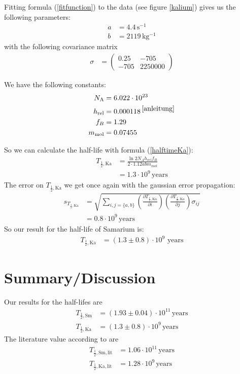 \documentclass[12pt]{article}
\newcommand{\del}[2][]{\frac{\partial #1}{\partial #2}}
\begin{document}
Fitting formula (\ref{fitfunction}) to the data (see figure \ref{kalium}) gives us the following parameters:
\begin{align*}
	a&=4.4\,\mathrm{s^{-1}}\\
	b&=2119\,\mathrm{kg^{-1}}
\end{align*}
with the following covariance matrix
\begin{align*}
\sigma&=\left(
	\begin{matrix}
		0.25&-705\\
		-705&2250000
	\end{matrix}
\right)
\end{align*}

We have the following constants:
\begin{align*}
	N_{\text{A}}&=6.022\cdot10^{23}\\
	h_{\text{rel}}&=0.000118\,^{\cite{anleitung}}\\
	f_B&=1.29\\
	m_{\text{mol}}&=0.07455
\end{align*}

So we can calculate the half-life with formula (\ref{halftimeKa}):
\begin{align*}
	T_{\frac12,\text{Ka}}&=\frac{\ln2N_Ah_{rel}f_B}{2\cdot1.12abm_{mol}}\\
	&=1.3\cdot10^{9}\,\text{years}
\end{align*}
The error on $T_{\frac12,\text{Ka}}$ we get once again with the gaussian error propagation: 
\begin{align*}
	s_{T_{\frac12,\text{Ka}}}&=\sqrt{\sum_{i,j=\{a,b\}}\left(\del[T_{\frac12,\text{Ka}}]{i}\right)\left(\del[T_{\frac12,\text{Ka}}]{j}\right)\sigma_{ij}}\\
	&=0.8\cdot10^9\,\text{years}
\end{align*}
So our result for the half-life of Samarium is:
\begin{align*}
T_{\frac12,\text{Ka}}&=\left(1.3\pm0.8\right)\cdot10^{9}\text{ years}
\end{align*}
\newpage
\section{Summary/Discussion}
Our results for the half-lifes are
\begin{align*}
	T_{\frac12,\text{Sm}}&=\left(1.93\pm0.04\right)\cdot10^{11}\,\text{years}\\
	T_{\frac12,\text{Ka}}&=\left(1.3 \pm0.8 \right)\cdot10^{9} \,\text{years}
\end{align*}
The literature value according to \cite{anleitung} are
\begin{align*}
	T_{\frac12,\text{Sm},\text{lit}}&=1.06\cdot10^{11}\,\text{years}\\
	T_{\frac12,\text{Ka},\text{lit}}&=1.28\cdot10^{9} \,\text{years}
\end{align*}
\end{document}
